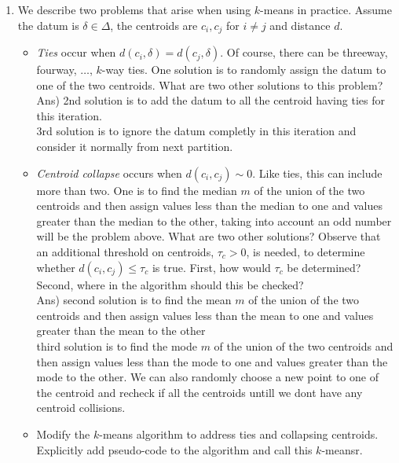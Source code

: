 \documentclass{article}
\begin{document}
\begin{enumerate}
\item We describe two problems that arise when using $k$-means in practice.  Assume the datum is $\delta\in\Delta$, the centroids are $c_i, c_j$ for $i\neq j$ and distance $d$.  
\begin{itemize}
\item {\it Ties} occur when $d(c_i, \delta) = d(c_j, \delta)$.  Of course, there can be threeway, fourway, $\ldots$, $k$-way ties.  One solution is to randomly assign the datum to one of the two centroids.   What are two other solutions to this problem? \\
Ans) 2nd solution is to add the datum to all the centroid having ties for this iteration. \\
3rd solution is to ignore the datum completly in this iteration and consider it normally from next partition.
\item {\it Centroid collapse} occurs when $d(c_i, c_j) \sim 0$. Like ties, this can include more than two.  One is to find the median $m$ of the union of the two centroids and then assign values less than the median to one and values greater than the median to the other, taking into account an odd number will be the problem above.  What are two other solutions?  Observe that an additional threshold on centroids, $\tau_c > 0$, is needed, to determine whether $d(c_i, c_j) \leq \tau_c$ is true.  First, how would $\tau_c$ be determined?  Second, where in the algorithm should this be checked? \\
Ans) second solution is to find the mean $m$ of the union of the two centroids and then assign values less than the mean to one and values greater than the mean to the other \\
third solution is to find the mode $m$ of the union of the two centroids and then assign values less than the mode to one and values greater than the mode to the other. We can also randomly choose a new point to one of the centroid and recheck if all the centroids untill we dont have any centroid collisions.\\

\item Modify the $k$-means algorithm to address ties and collapsing centroids.  Explicitly add pseudo-code to the algorithm and call this $k$-meansr. 
 	\\
\end{itemize}
\end{enumerate}
\end{document}
